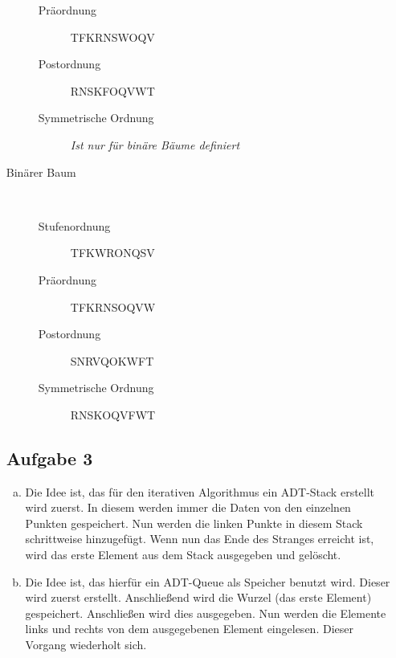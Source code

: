 \documentclass[11pt]{article}
\begin{document}
\begin{enumerate}[a)]
\begin{description}
\begin{description}
          \item[Präordnung]
            TFKRNSWOQV

          \item[Postordnung]
            RNSKFOQVWT

          \item[Symmetrische Ordnung]
            \emph{Ist nur für binäre Bäume definiert}

        \end{description}

      \item[Binärer Baum] $ $
        \begin{description}

          \item[Stufenordnung] 
            TFKWRONQSV

          \item[Präordnung]
            TFKRNSOQVW

          \item[Postordnung]
            SNRVQOKWFT

          \item[Symmetrische Ordnung]
            RNSKOQVFWT

        \end{description}
    \end{description}
    \subsection*{Aufgabe 3}
    \begin{enumerate}[a.)]
    	
      \item
      Die Idee ist, das für den iterativen Algorithmus ein ADT-Stack erstellt
      wird zuerst. In diesem werden immer die Daten von den einzelnen Punkten
      gespeichert. Nun werden die linken Punkte in diesem Stack schrittweise 
      hinzugefügt. Wenn nun das Ende des Stranges erreicht ist, wird das 
      erste Element aus dem Stack ausgegeben und gelöscht.
      
      
      
       
       
      \item
      Die Idee ist, das hierfür ein ADT-Queue als Speicher benutzt wird.
      Dieser wird zuerst erstellt. Anschließend wird die Wurzel 
      (das erste Element) gespeichert. Anschließen wird dies ausgegeben.
      Nun werden die Elemente links und rechts von dem ausgegebenen Element eingelesen. Dieser Vorgang wiederholt sich.
      
          
    \end{enumerate}
     
        
\end{enumerate} 
\end{document}
